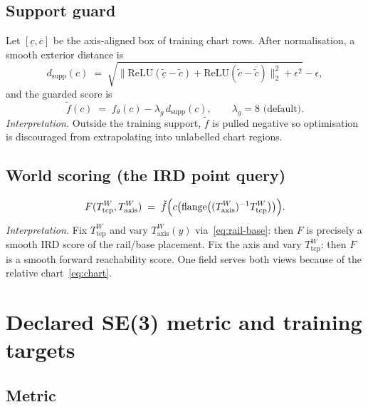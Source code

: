 \documentclass[11pt,a4paper]{article}
\newcommand{\Tcp}{T_{\mathrm{tcp}}}
\newcommand{\Taxis}{T_{\mathrm{axis}}}
\begin{document}
\subsection{Support guard}
\label{sec:guard}

Let \([\underline c,\overline c]\) be the axis-aligned box of training chart
rows. After normalisation, a smooth exterior distance is
\begin{equation}
\label{eq:support-dist}
  d_{\mathrm{supp}}(c)
  \;=\;
  \sqrt{
    \bigl\|
      \mathrm{ReLU}(\underline{\tilde c}-\tilde c)
      +
      \mathrm{ReLU}(\tilde c-\overline{\tilde c})
    \bigr\|_{2}^{2}
    +\epsilon^{2}
  }
  -\epsilon,
\end{equation}
and the guarded score is
\begin{equation}
\label{eq:guarded}
  \tilde f(c)
  \;=\;
  f_{\theta}(c)
  -
  \lambda_{g}\, d_{\mathrm{supp}}(c),
  \qquad
  \lambda_{g}=8\text{ (default)}.
\end{equation}
\emph{Interpretation.}
Outside the training support, \(\tilde f\) is pulled negative so optimisation
is discouraged from extrapolating into unlabelled chart regions.

\subsection{World scoring (the IRD point query)}
\label{sec:score-world}

\begin{equation}
\label{eq:score-world}
  F(\Tcp^{W},\Taxis^{W})
  \;=\;
  \tilde f\Bigl(
    c\bigl(
      \mathrm{flange}\bigl(
        (\Taxis^{W})^{-1}\Tcp^{W}
      \bigr)
    \bigr)
  \Bigr).
\end{equation}
\emph{Interpretation.}
Fix \(\Tcp^{W}\) and vary \(\Taxis^{W}(y)\) via~\eqref{eq:rail-base}: then
\(F\) is precisely a smooth IRD score of the rail/base placement. Fix the
axis and vary \(\Tcp^{W}\): then \(F\) is a smooth forward reachability score.
One field serves both views because of the relative chart~\eqref{eq:chart}.

\section{Declared SE(3) metric and training targets}
\label{sec:training}

\subsection{Metric}
\label{sec:metric}
\end{document}
